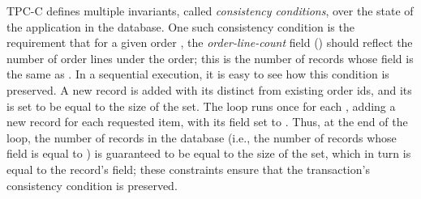 TPC-C defines multiple invariants, called \emph{consistency
  conditions}, over the state of the application in the database. One
such consistency condition is the requirement that for a given order
, the \emph{order-line-count} field () should
reflect the number of order lines under the order; this is the number
of  records whose  field is the same as
.  In a sequential execution, it is easy to see how this
condition is preserved.  A new  record is added with its
 distinct from existing order ids, and its  is
set to be equal to the size of the  set. The 
loop runs once for each , adding a new 
record for each requested item, with its  field set to
. Thus, at the end of the loop, the number of 
records in the database (i.e., the number of records whose
 field is equal to ) is guaranteed to be equal
to the size of the  set, which in turn is equal to the
 record's  field; these constraints ensure that
the transaction's consistency condition is preserved.

